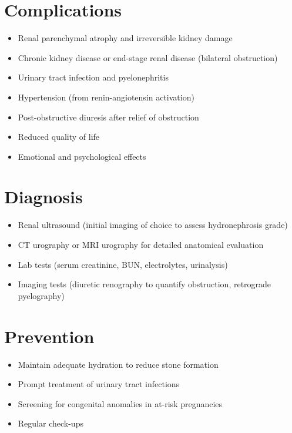 \section{Complications}
\begin{itemize}[noitemsep]
  \item Renal parenchymal atrophy and irreversible kidney damage
  \item Chronic kidney disease or end-stage renal disease (bilateral obstruction)
  \item Urinary tract infection and pyelonephritis
  \item Hypertension (from renin-angiotensin activation)
  \item Post-obstructive diuresis after relief of obstruction
  \item Reduced quality of life
  \item Emotional and psychological effects
\end{itemize}

\section{Diagnosis}
\begin{itemize}[noitemsep]
  \item Renal ultrasound (initial imaging of choice to assess hydronephrosis grade)
  \item CT urography or MRI urography for detailed anatomical evaluation
  \item Lab tests (serum creatinine, BUN, electrolytes, urinalysis)
  \item Imaging tests (diuretic renography to quantify obstruction, retrograde pyelography)
\end{itemize}

\section{Prevention}
\begin{itemize}[noitemsep]
  \item Maintain adequate hydration to reduce stone formation
  \item Prompt treatment of urinary tract infections
  \item Screening for congenital anomalies in at-risk pregnancies
  \item Regular check-ups
\end{itemize}

